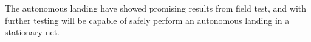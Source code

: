 The autonomous landing have showed promising results from field test, and with further testing will be capable of safely perform an autonomous landing in a stationary net.





%
%
%
%

